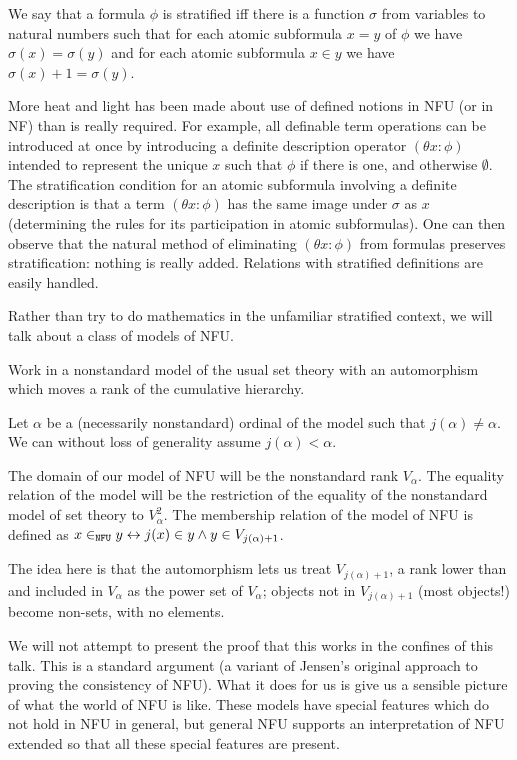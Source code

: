 \documentclass{slides}
\begin{document}
\begin{slide}

We say that a formula $\phi$ is stratified iff there is a function $\sigma$ from variables to natural numbers such that
for each atomic subformula $x=y$ of $\phi$ we have $\sigma(x)=\sigma(y)$ and for each atomic subformula $x \in y$ we have $\sigma(x)+1= \sigma(y)$.

More heat and light has been made about use of defined notions in NFU (or in NF) than is really required.  For example, all definable term operations can be introduced at once by introducing a definite description operator
$(\theta x:\phi)$ intended to represent the unique $x$ such that $\phi$ if there is one, and otherwise $\emptyset$.
The stratification condition for an atomic subformula involving a definite description is that a term $(\theta x:\phi)$ has the same image under $\sigma$ as $x$ (determining the rules for its participation in atomic subformulas).  One can then observe that the natural method of eliminating $(\theta x:\phi)$ from formulas preserves stratification:  nothing is really added.  Relations with stratified definitions are easily handled.

\end{slide}

\begin{slide}

Rather than try to do mathematics in the unfamiliar stratified context, we will talk about a class of models of NFU.

Work in a nonstandard model of the usual set theory with an automorphism which moves a rank of the cumulative hierarchy.

Let $\alpha$ be a (necessarily nonstandard) ordinal of the model such that $j(\alpha) \neq \alpha$.  We can without loss of generality assume $j(\alpha)<\alpha$.

The domain of our model of NFU will be the nonstandard rank $V_\alpha$.  The equality relation of the model will be the restriction of the equality of the nonstandard model of set theory to $V_\alpha^2$.  The membership relation of the model of NFU is defined as $x \in_{\tt NFU} y \leftrightarrow j(x) \in y \wedge y \in V_{j(\alpha)+1}$.

\end{slide}


\begin{slide}

The idea here is that the automorphism lets us treat $V_{j(\alpha)+1}$, a rank lower than and included in $V_\alpha$
as the power set of $V_\alpha$;  objects not in $V_{j(\alpha)+1}$ (most objects!) become non-sets, with no elements.

We will not attempt to present the proof that this works in the confines of this talk.  This is a standard argument (a variant of Jensen's original approach to proving the consistency of NFU).  What it does for us is give us a sensible picture of what the world of NFU is like.  These models have special features which do not hold in NFU in general, but general NFU supports an interpretation of NFU extended so that  all these special features are present.

\end{slide}
\end{document}
